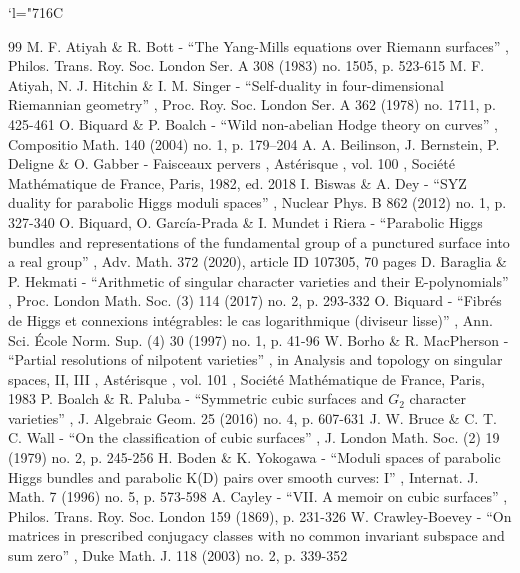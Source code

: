 \documentclass[11pt]{article}
\newcommand{\Changelback}{\mathcode`l="716C}
\theoremstyle{definition}
\theoremstyle{plain}
\begin{document}
\Changelback


\begin{thebibliography}{99}
 M. F. Atiyah \& R. Bott - “The Yang-Mills equations over Riemann surfaces” , Philos. Trans. Roy. Soc. London Ser. A 308 (1983) no. 1505, p. 523-615
 M. F. Atiyah, N. J. Hitchin \& I. M. Singer - “Self-duality in four-dimensional Riemannian geometry” , Proc. Roy. Soc. London Ser. A 362 (1978) no. 1711, p. 425-461
 O. Biquard \& P. Boalch - “Wild non-abelian Hodge theory on curves” , Compositio Math. 140 (2004) no. 1, p. 179–204
 A. A. Beilinson, J. Bernstein, P. Deligne \& O. Gabber - Faisceaux pervers , Astérisque , vol. 100 , Société Mathématique de France, Paris, 1982, ed. 2018
 I. Biswas \& A. Dey - “SYZ duality for parabolic Higgs moduli spaces” , Nuclear Phys. B 862 (2012) no. 1, p. 327-340
 O. Biquard, O. García-Prada \& I. Mundet i Riera - “Parabolic Higgs bundles and representations of the fundamental group of a punctured surface into a real group” , Adv. Math. 372 (2020), article ID 107305, 70 pages
 D. Baraglia \& P. Hekmati - “Arithmetic of singular character varieties and their E-polynomials” , Proc. London Math. Soc. (3) 114 (2017) no. 2, p. 293-332
 O. Biquard - “Fibrés de Higgs et connexions intégrables: le cas logarithmique (diviseur lisse)” , Ann. Sci. École Norm. Sup. (4) 30 (1997) no. 1, p. 41-96
 W. Borho \& R. MacPherson - “Partial resolutions of nilpotent varieties” , in Analysis and topology on singular spaces, II, III , Astérisque , vol. 101 , Société Mathématique de France, Paris, 1983
 P. Boalch \& R. Paluba - “Symmetric cubic surfaces and ${G}_2$ character varieties” , J. Algebraic Geom. 25 (2016) no. 4, p. 607-631
 J. W. Bruce \& C. T. C. Wall - “On the classification of cubic surfaces” , J. London Math. Soc. (2) 19 (1979) no. 2, p. 245-256
 H. Boden \& K. Yokogawa - “Moduli spaces of parabolic Higgs bundles and parabolic K(D) pairs over smooth curves: I” , Internat. J. Math. 7 (1996) no. 5, p. 573-598
 A. Cayley - “VII. A memoir on cubic surfaces” , Philos. Trans. Roy. Soc. London 159 (1869), p. 231-326
 W. Crawley-Boevey - “On matrices in prescribed conjugacy classes with no common invariant subspace and sum zero” , Duke Math. J. 118 (2003) no. 2, p. 339-352

\end{thebibliography}
\end{document}
